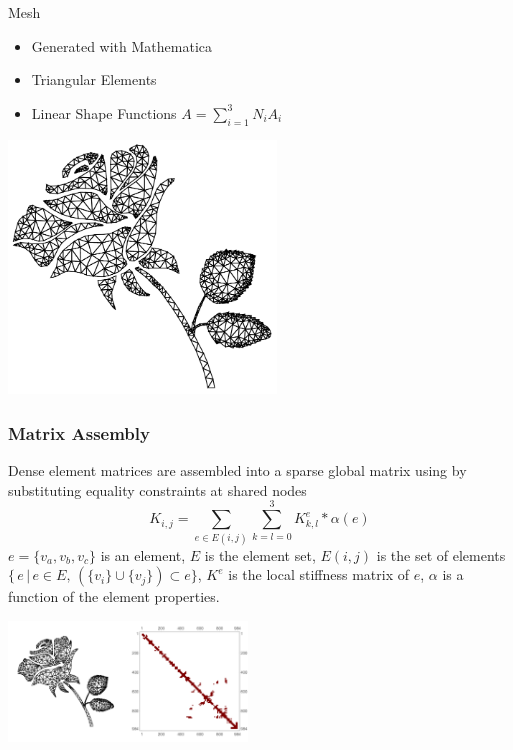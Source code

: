 \documentclass{beamer}
\begin{document}
    \begin{frame}{Mesh}
        \begin{itemize}
            \item Generated with Mathematica
            \item Triangular Elements
            \item Linear Shape Functions
            $A=\sum_{i=1}^{3}N_{i}A_i$
        \end{itemize}
        \begin{center}
            \includegraphics[width=2.8in]{rosemesh.pdf}
        \end{center}
    \end{frame}
    \begin{frame}[fragile]
        \frametitle{Matrix Assembly}
        Dense element matrices are assembled into a sparse global matrix using by substituting equality constraints at shared nodes
        \[K_{i,j}=\sum_{e\in E(i,j)}\sum_{k=l=0}^{3} K^{e}_{k,l}*\alpha(e)\]
        $e=\{v_a,v_b,v_c\}$ is an element, $E$ is the element set, $E(i,j)$ is the set of elements $\{\,e\,|\,e\in E,\,\left(\{v_i\}\cup\{v_j\}\right)\subset e\}$, $K^{e}$ is the local stiffness matrix of $e$, $\alpha$ is a function of the element properties.\\
        \begin{center}
            \includegraphics[width=2.5in]{meshmatrix.png}
        \end{center}
    \end{frame}
\end{document}

